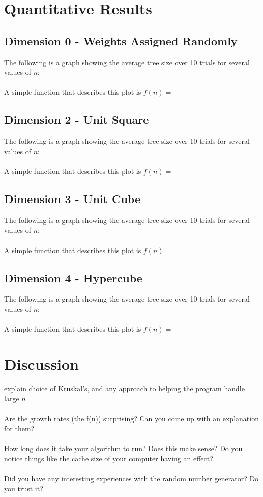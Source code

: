 \documentclass[solution, letterpaper]{cs121}
\begin{document}

\section{Quantitative Results}
\subsection*{Dimension 0 - Weights Assigned Randomly}

The following is a graph showing the average tree size over 10 trials for several values of $n$: \\ \\
A simple function that describes this plot is $f(n) = $

\subsection*{Dimension 2 - Unit Square}

The following is a graph showing the average tree size over 10 trials for several values of $n$: \\ \\
A simple function that describes this plot is $f(n) = $

\subsection*{Dimension 3 - Unit Cube}

The following is a graph showing the average tree size over 10 trials for several values of $n$: \\ \\
A simple function that describes this plot is $f(n) = $

\subsection*{Dimension 4 - Hypercube}

The following is a graph showing the average tree size over 10 trials for several values of $n$: \\ \\
A simple function that describes this plot is $f(n) = $

\section*{Discussion}

explain choice of Kruskal's, and any approach to helping the program handle large $n$ \\ \\
Are the growth rates (the f(n)) surprising? Can you come up with an explanation for them? \\ \\
How long does it take your algorithm to run? Does this make sense? Do you notice things like the cache size of your computer having an effect? \\ \\
Did you have any interesting experiences with the random number generator? Do you trust it? \\ \\
\end{document}
